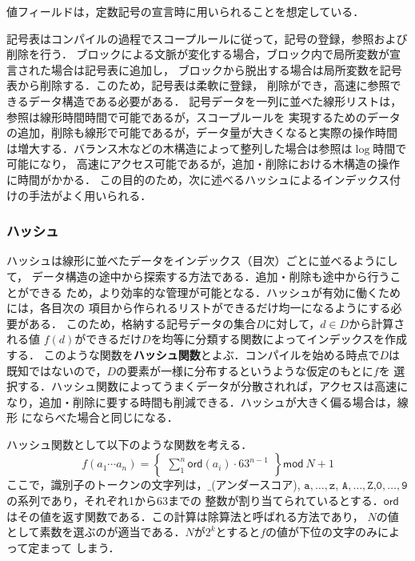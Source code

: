 \documentclass[a4j,dvipdfmx]{jbook}
\begin{document}
値フィールドは，定数記号の宣言時に用いられることを想定している．

記号表はコンパイルの過程でスコープルールに従って，記号の登録，参照および削除を行う．
ブロックによる文脈が変化する場合，ブロック内で局所変数が宣言された場合は記号表に追加し，
ブロックから脱出する場合は局所変数を記号表から削除する．このため，記号表は柔軟に登録，
削除ができ，高速に参照できるデータ構造である必要がある．
記号データを一列に並べた線形リストは，参照は線形時間時間で可能であるが，スコープルールを
実現するためのデータの追加，削除も線形で可能であるが，データ量が大きくなると実際の操作時間
は増大する．バランス木などの木構造によって整列した場合は参照は$\log$時間で可能になり，
高速にアクセス可能であるが，追加・削除における木構造の操作に時間がかかる．
この目的のため，次に述べるハッシュによるインデックス付けの手法がよく用いられる．

\subsubsection{ハッシュ}

ハッシュは線形に並べたデータをインデックス（目次）ごとに並べるようにして，
データ構造の途中から探索する方法である．追加・削除も途中から行うことができる
ため，より効率的な管理が可能となる．ハッシュが有効に働くためには，各目次の
項目から作られるリストができるだけ均一になるようにする必要がある．
このため，格納する記号データの集合$D$に対して，$d\in D$から計算される値
$f(d)$ができるだけ$D$を均等に分類する関数によってインデックスを作成する．
このような関数を{\bf ハッシュ関数}とよぶ．コンパイルを始める時点で$D$は
既知ではないので，$D$の要素が一様に分布するというような仮定のもとに$f$を
選択する．ハッシュ関数によってうまくデータが分散されれば，アクセスは高速に
なり，追加・削除に要する時間も削減できる．ハッシュが大きく偏る場合は，線形
にならべた場合と同じになる．

ハッシュ関数として以下のような関数を考える．
\[
f(a_1\cdots a_n)=\left\{\begin{array}{l}
    \sum^n_1\mathsf{ord}(a_i)\cdot 63^{n-1}
\end{array}\right\}\mathsf{mod}\ N+1
\]
ここで，識別子のトークンの文字列は，$\texttt{\_}$(アンダースコア), $\texttt{a},\ldots,\texttt{z}$,
$\texttt{A},\ldots,\texttt{Z}$,$\texttt{0},\ldots,\texttt{9}$の系列であり，それぞれ1から63までの
整数が割り当てられているとする．$\mathsf{ord}$はその値を返す関数である．この計算は除算法と呼ばれる方法であり，
$N$の値として素数を選ぶのが適当である．$N$が$2^k$とすると$f$の値が下位の文字のみによって定まって
しまう．
\end{document}
